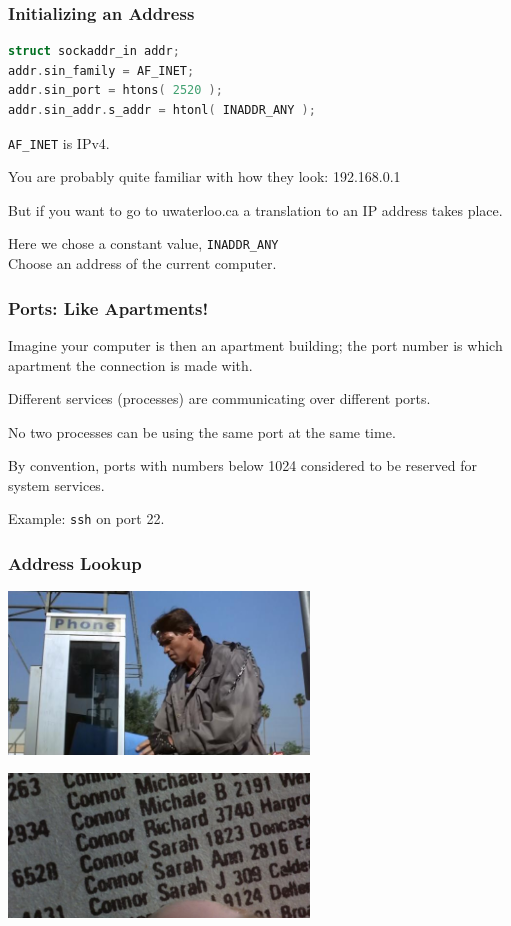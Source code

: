 \begin{frame}[fragile]
\frametitle{Initializing an Address}

\begin{lstlisting}[language=C]
struct sockaddr_in addr;
addr.sin_family = AF_INET;
addr.sin_port = htons( 2520 );
addr.sin_addr.s_addr = htonl( INADDR_ANY );
\end{lstlisting}

\texttt{AF\_INET} is IPv4.

You are probably quite familiar with how they look: 192.168.0.1

But if you want to go to uwaterloo.ca a translation to an IP address takes place.

Here we chose a constant value, \texttt{INADDR\_ANY}\\
\quad Choose an address of the current computer.

\end{frame}


\begin{frame}
\frametitle{Ports: Like Apartments!}

Imagine your computer is then an apartment building; the port number is which apartment the connection is made with. 

Different services (processes) are communicating over different ports. 

No two processes can be using the same port at the same time. 

By convention, ports with numbers below 1024 considered to be reserved for system services.

Example: \texttt{ssh} on port 22.

\end{frame}


\begin{frame}
\frametitle{Address Lookup}

\begin{center}
	\includegraphics[width=0.6\textwidth]{images/terminator-phonebook1.jpg}
\end{center}
\begin{center}
	\includegraphics[width=0.6\textwidth]{images/terminator-phonebook2.jpg}
\end{center}


\end{frame}


